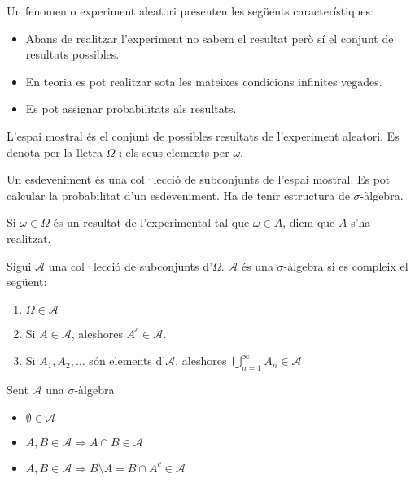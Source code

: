 \documentclass[../main.tex]{subfiles}
\begin{document}
    \begin{definicio}
        Un fenomen o experiment aleatori presenten les següents característiques:
        \begin{itemize}
            \item Abans de realitzar l'experiment no sabem el resultat però sí el conjunt de resultats
            possibles.
            \item En teoria es pot realitzar sota les mateixes condicions infinites vegades.
            \item Es pot assignar probabilitats als resultats.
        \end{itemize}
    \end{definicio}
    \begin{definicio}
        L'espai mostral és el conjunt de possibles resultats de l'experiment aleatori. Es denota per
        la lletra $\Omega$ i els seus elements per $\omega$.
    \end{definicio}
    \begin{definicio}
        Un esdeveniment és una col·lecció de subconjunts de l'espai mostral. Es pot calcular la
        probabilitat d'un esdeveniment. Ha de tenir estructura de $\sigma$-àlgebra.
    \end{definicio}
    \begin{notacio}
        Si $\omega \in \Omega$ és un resultat de l'experimental tal que $\omega \in A$, diem que $A$ s'ha realitzat.
    \end{notacio}
    \begin{definicio}
        Sigui $\mathcal{A}$ una col·lecció de subconjunts d'$\Omega$. $\mathcal{A}$ és una
        $\sigma$-àlgebra si es compleix el següent:
        \begin{enumerate}
            \item $\Omega \in \mathcal{A}$
            \item Si $A \in \mathcal{A}$, aleshores $A^c \in \mathcal{A}$.
            \item Si $A_1, A_2, \dots$ són elements d'$\mathcal{A}$, aleshores $\bigcup\limits_{n=1}^\infty A_n \in \mathcal{A}$
        \end{enumerate}
    \end{definicio}
    \begin{corolari}
        Sent $\mathcal{A}$ una $\sigma$-àlgebra
        \begin{itemize}
            \item $\emptyset \in \mathcal{A}$
            \item $A, B \in \mathcal{A} \Rightarrow A \cap B \in \mathcal{A}$
            \item $A, B \in \mathcal{A} \Rightarrow B \setminus A = B\cap A^c \in \mathcal{A}$
        \end{itemize}
    \end{corolari}
\end{document}
